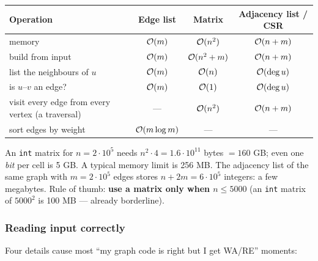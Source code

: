 \begin{table}[H]
\centering\small
\begin{tabularx}{\linewidth}{@{}X c c c@{}}
\toprule
\textbf{Operation} & \textbf{Edge list} & \textbf{Matrix} & \textbf{Adjacency list / CSR} \\
\midrule
memory & $\mathcal{O}(m)$ & $\mathcal{O}(n^2)$ & $\mathcal{O}(n+m)$ \\
build from input & $\mathcal{O}(m)$ & $\mathcal{O}(n^2+m)$ & $\mathcal{O}(n+m)$ \\
list the neighbours of $u$ & $\mathcal{O}(m)$ & $\mathcal{O}(n)$ & $\mathcal{O}(\deg u)$ \\
is $u$--$v$ an edge? & $\mathcal{O}(m)$ & $\mathcal{O}(1)$ & $\mathcal{O}(\deg u)$ \\
visit every edge from every vertex (a traversal) & --- & $\mathcal{O}(n^2)$ & $\mathcal{O}(n+m)$ \\
sort edges by weight & $\mathcal{O}(m\log m)$ & --- & --- \\
\bottomrule
\end{tabularx}
\end{table}

\begin{warningbox}[{$n = 2\cdot 10^5$: the matrix is impossible}]
An \texttt{int} matrix for $n=2\cdot10^5$ needs $n^2\cdot 4 = 1.6\cdot10^{11}$ bytes $=160$ GB; even one \emph{bit} per cell is 5 GB. A typical memory limit is 256 MB. The adjacency list of the same graph with $m=2\cdot10^5$ edges stores $n+2m=6\cdot10^5$ integers: a few megabytes. Rule of thumb: \textbf{use a matrix only when $n\le 5000$} (an \texttt{int} matrix of $5000^2$ is 100 MB --- already borderline).
\end{warningbox}

\subsubsection*{Reading input correctly}

Four details cause most ``my graph code is right but I get WA/RE'' moments:

